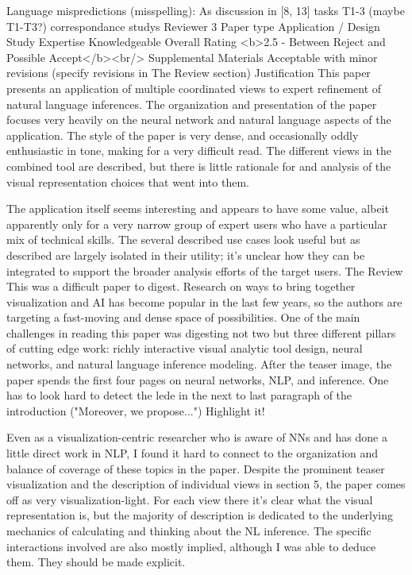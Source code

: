 Language mispredictions (misspelling):
As discussion in [8, 13]
tasks T1-3 (maybe T1-T3?)
correspondance
studys
Reviewer 3
Paper type
Application / Design Study
Expertise
Knowledgeable
Overall Rating
<b>2.5 - Between Reject and Possible Accept</b><br/>
Supplemental Materials
Acceptable with minor revisions (specify revisions in The Review section)
Justification
This paper presents an application of multiple coordinated views to expert refinement of natural language inferences. The organization and presentation of the paper focuses very heavily on the neural network and natural language aspects of the application. The style of the paper is very dense, and occasionally oddly enthusiastic in tone, making for a very difficult read. The different views in the combined tool are described, but there is little rationale for and analysis of the visual representation choices that went into them.

The application itself seems interesting and appears to have some value, albeit apparently only for a very narrow group of expert users who have a particular mix of technical skills. The several described use cases look useful but as described are largely isolated in their utility; it's unclear how they can be integrated to support the broader analysis efforts of the target users.
The Review
This was a difficult paper to digest. Research on ways to bring together visualization and AI has become popular in the last few years, so the authors are targeting a fast-moving and dense space of possibilities. One of the main challenges in reading this paper was digesting not two but three different pillars of cutting edge work: richly interactive visual analytic tool design, neural networks, and natural language inference modeling. After the teaser image, the paper spends the first four pages on neural networks, NLP, and inference. One has to look hard to detect the lede in the next to last paragraph of the introduction ("Moreover, we propose...") Highlight it!

Even as a visualization-centric researcher who is aware of NNs and has done a little direct work in NLP, I found it hard to connect to the organization and balance of coverage of these topics in the paper. Despite the prominent teaser visualization and the description of individual views in section 5, the paper comes off as very visualization-light. For each view there it's clear what the visual representation is, but the majority of description is dedicated to the underlying mechanics of calculating and thinking about the NL inference. The specific interactions involved are also mostly implied, although I was able to deduce them. They should be made explicit.

